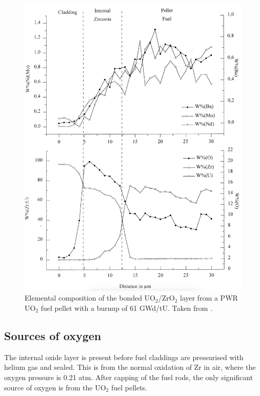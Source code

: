 \begin{figure}[ht!] %
\centering
\includegraphics[width=14cm]{images/bonding_layer_composition.png}
\caption[Elemental composition of the bonded UO$_{2}$/ZrO$_{2}$ layer from a PWR UO$_{2}$ fuel pellet with a burnup of 61 GWd/tU.]{Elemental composition of the bonded UO$_{2}$/ZrO$_{2}$ layer from a PWR UO$_{2}$ fuel pellet with a burnup of 61 GWd/tU. Taken from \cite{Lozano1998}.}
\label{figure:bonding_layer_composition}
\end{figure}


\subsection{Sources of oxygen}

The internal oxide layer is present before fuel claddings are pressurised with helium gas and sealed. This is from the normal oxidation of Zr in air, where the oxygen pressure is 0.21 atm. After capping of the fuel rods, the only significant source of oxygen is from the UO$_{2}$ fuel pellets.

